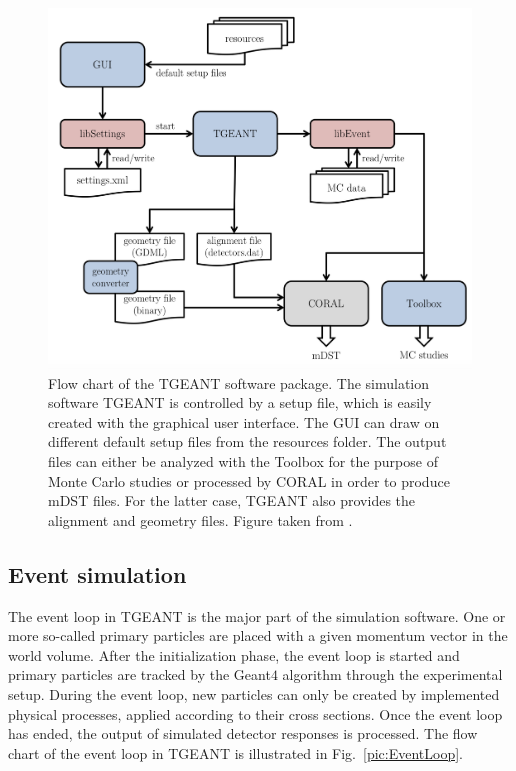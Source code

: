 \begin{figure}[!h]
  \centering
	\includegraphics[scale=0.5]{./gfx/TGEANTflowchart.png}
	\caption{Flow chart of the TGEANT software package. The simulation software TGEANT is controlled by a setup file, which is easily created with the graphical user interface. The GUI can draw on different default setup files from the resources folder. The output files can either be analyzed with the Toolbox for the purpose of Monte Carlo studies or processed by CORAL in order to produce mDST files. For the latter case, TGEANT also provides the alignment and geometry files. Figure taken from \cite{Tobias}.}
	\label{pic:TGEANTflowchart}
\end{figure}

\subsection{Event simulation}

The event loop in TGEANT is the major part of the simulation software. One or more so-called primary particles are placed with a given momentum vector in the world volume. After the initialization phase, the event loop is started and primary particles are tracked by the Geant$4$ algorithm through the experimental setup. During the event loop, new particles can only be created by implemented physical processes, applied according to their cross sections. Once the event loop has ended, the output of simulated detector responses is processed. The flow chart of the event loop in TGEANT is illustrated in Fig.~\ref{pic:EventLoop}.

